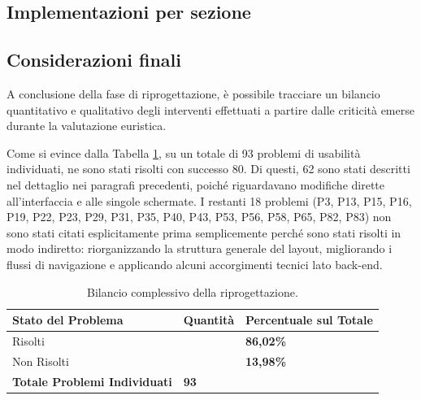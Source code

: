 \subsection{Implementazioni per sezione}
\label{implementazioni_per_sezione}










\subsection{Considerazioni finali}
A conclusione della fase di riprogettazione, è possibile tracciare un bilancio quantitativo e qualitativo degli interventi effettuati a partire dalle criticità emerse durante la valutazione euristica.

Come si evince dalla Tabella \ref{tab:bilancio_riprogettazione}, su un totale di 93 problemi di usabilità individuati, ne sono stati risolti con successo 80. Di questi, 62 sono stati descritti nel dettaglio nei paragrafi precedenti, poiché riguardavano modifiche dirette all'interfaccia e alle singole schermate. I restanti 18 problemi (P3, P13, P15, P16, P19, P22, P23, P29, P31, P35, P40, P43, P53, P56, P58, P65, P82, P83) non sono stati citati esplicitamente prima semplicemente perché sono stati risolti in modo indiretto: riorganizzando la struttura generale del layout, migliorando i flussi di navigazione e applicando alcuni accorgimenti tecnici lato back-end.

\begin{table}[H]
	\centering
	\footnotesize
	\renewcommand{\arraystretch}{1.2}
	\caption{Bilancio complessivo della riprogettazione.}
	\label{tab:bilancio_riprogettazione}
	\begin{tabular}{|>{\raggedright\arraybackslash}p{6.5cm}|>{\centering\arraybackslash}p{2cm}|>{\centering\arraybackslash}p{3cm}|}
		\hline
		\rowcolor{gray!30}
		\textbf{Stato del Problema}          & \textbf{Quantità} & \textbf{Percentuale sul Totale} \\ \hline
		Risolti                              & 80                & \textbf{86,02\%}                \\ \hline
		Non Risolti                          & 13                & \textbf{13,98\%}                \\ \hline
		\rowcolor{gray!30}
		\textbf{Totale Problemi Individuati} & \textbf{93}       &                                 \\ \hline
	\end{tabular}
\end{table}

